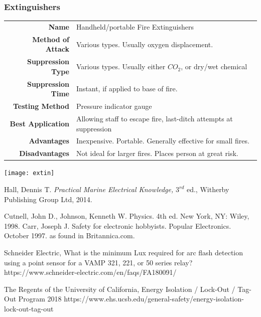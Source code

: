 \documentclass[11pt,a4paper]{article}
\begin{document}
\subsubsection{Extinguishers}
\begin{tabular}{|r|l|}
\hline
\textbf{Name} & Handheld/portable Fire Extinguishers \\
\textbf{Method of Attack} & Various types. Usually oxygen displacement.\\
\textbf{Suppression Type} & Various types. Usually either $CO_2$, or dry/wet chemical \\
\textbf{Suppression Time} & Instant, if applied to base of fire.\\
\textbf{Testing Method} & Pressure indicator gauge\\
\textbf{Best Application} & Allowing staff to escape fire, last-ditch attempts at suppression\\
\textbf{Advantages} & Inexpensive. Portable. Generally effective for small fires.\\
\textbf{Disadvantages} & Not ideal for larger fires. Places person at great risk.\\
\hline
\end{tabular}
\begin{center}
\texttt{[image: extin]}
\end{center}
\newpage
\begin{thebibliography}{9}
Hall, Dennis T.
\textit{Practical Marine Electrical Knowledge,} $3^{rd}$ ed., Witherby Publishing Group Ltd, 2014.

Cutnell, John D., Johnson, Kenneth W. Physics. 4th ed. New York, NY: Wiley, 1998.
Carr, Joseph J. Safety for electronic hobbyists. Popular Electronics. October 1997. as found in Britannica.com.

Schneider Electric, What is the minimum Lux required for arc flash detection using a point sensor for a VAMP 321, 221, or 50 series relay?
https://www.schneider-electric.com/en/faqs/FA180091/

The Regents of the University of California, Energy Isolation / Lock-Out / Tag-Out Program 2018
https://www.ehs.ucsb.edu/general-safety/energy-isolation-lock-out-tag-out
\end{thebibliography}
\end{document}
